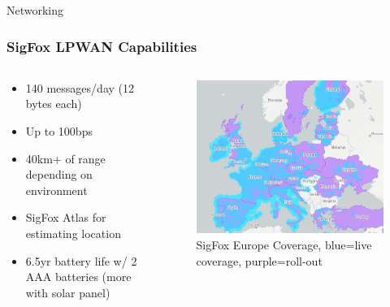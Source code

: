 \documentclass{beamer}
\begin{document}
  \begin{frame}{Networking}
    \frametitle{SigFox LPWAN Capabilities}
    \begin{columns}
      \begin{column}{0.5\textwidth}
        \begin{itemize}
          \item 140 messages/day (12 bytes each)
          \item Up to 100bps
          \item 40km+ of range depending on environment
          \item SigFox Atlas for estimating location
          \item 6.5yr battery life w/ 2 AAA batteries (more with solar panel)
        \end{itemize}
      \end{column}
      \begin{column}{0.5\textwidth}
        \begin{figure}[htbp]
          \centering
          \includegraphics[width=\textwidth]{SigFoxCoverage.png}
          \caption{SigFox Europe Coverage, blue=live coverage, purple=roll-out \cite{Sigfox_0G_Technology_2024}}
          \label{fig:SigFox_Coverage}
        \end{figure}
      \end{column}
    \end{columns}
  \end{frame}
\end{document}
